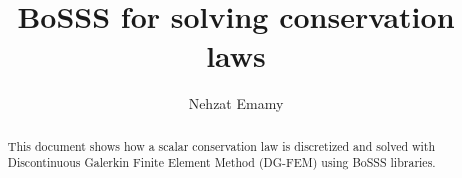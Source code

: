 \documentclass[11pt,twoside,a4paper]{fdyarticle}
\title{BoSSS for solving conservation laws}
\author{Nehzat Emamy}
\begin{document}

\setcounter{page}{1} %

\maketitle

\begin{abstract}
This document shows how a scalar conservation law is discretized and solved with Discontinuous Galerkin Finite Element Method (DG-FEM) using BoSSS libraries.
\end{abstract}

%
\end{document}
